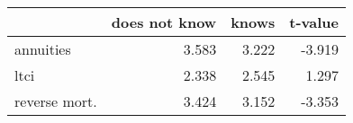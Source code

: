 \begin{tabular}{lrrr}
\toprule
{} &  does not know &  knows &  t-value \\
\midrule
annuities     &          3.583 &  3.222 &   -3.919 \\
ltci          &          2.338 &  2.545 &    1.297 \\
reverse mort. &          3.424 &  3.152 &   -3.353 \\
\bottomrule
\end{tabular}
